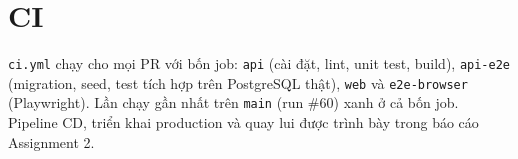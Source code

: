 \section{CI}\label{sec:se-ci}
\texttt{ci.yml} chạy cho mọi PR với bốn job: \texttt{api} (cài đặt, lint, unit test, build), \texttt{api-e2e} (migration, seed, test tích hợp trên PostgreSQL thật), \texttt{web} và \texttt{e2e-browser} (Playwright). Lần chạy gần nhất trên \texttt{main} (run \#60) xanh ở cả bốn job. Pipeline CD, triển khai production và quay lui được trình bày trong báo cáo Assignment 2.
